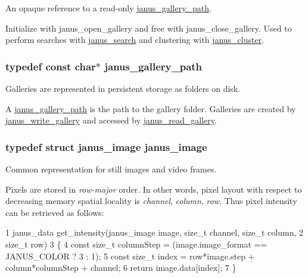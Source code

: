 An opaque reference to a read-\/only \hyperlink{group__janus_ga59a8cde3e9e96f7e337f9e1ebf5b4eac}{janus\+\_\+gallery\+\_\+path}. 

Initialize with janus\+\_\+open\+\_\+gallery and free with janus\+\_\+close\+\_\+gallery. Used to perform searches with \hyperlink{group__janus_ga3ad534c34ae38082eb49ce8457545653}{janus\+\_\+search} and clustering with \hyperlink{group__janus_gae282d9361c185efa20f13f0edcde283e}{janus\+\_\+cluster}. \hypertarget{group__janus_ga59a8cde3e9e96f7e337f9e1ebf5b4eac}{}
\subsubsection[{janus\+\_\+gallery\+\_\+path}]{\setlength{\rightskip}{0pt plus 5cm}typedef const char$\ast$ {\bf janus\+\_\+gallery\+\_\+path}}\label{group__janus_ga59a8cde3e9e96f7e337f9e1ebf5b4eac}


Galleries are represented in persistent storage as folders on disk. 

A \hyperlink{group__janus_ga59a8cde3e9e96f7e337f9e1ebf5b4eac}{janus\+\_\+gallery\+\_\+path} is the path to the gallery folder. Galleries are created by \hyperlink{group__janus_ga874a3668ca302fbff98e0df4cfa1a31c}{janus\+\_\+write\+\_\+gallery} and accessed by \hyperlink{group__janus_ga0e429c956e7c233414b7c64b18ee64ef}{janus\+\_\+read\+\_\+gallery}. \hypertarget{group__janus_gaea656fd6eccb34bf08ccedfb77be047d}{}
\subsubsection[{janus\+\_\+image}]{\setlength{\rightskip}{0pt plus 5cm}typedef struct {\bf janus\+\_\+image}  {\bf janus\+\_\+image}}\label{group__janus_gaea656fd6eccb34bf08ccedfb77be047d}


Common representation for still images and video frames. 

Pixels are stored in {\itshape row-\/major} order. In other words, pixel layout with respect to decreasing memory spatial locality is {\itshape channel}, {\itshape column}, {\itshape row}. Thus pixel intensity can be retrieved as follows\+:


\begin{DoxyCode}
1 janus\_data get\_intensity(janus\_image image, size\_t channel, size\_t column,
2                                                                      size\_t row)
3 \{
4     const size\_t columnStep = (image.image\_format == JANUS\_COLOR ? 3 : 1);
5     const size\_t index = row*image.step + column*columnStep + channel;
6     return image.data[index];
7 \}
\end{DoxyCode}



